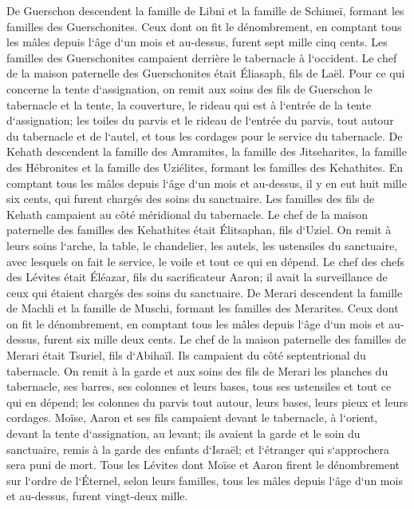\verse De Guerschon descendent la famille de Libni et la famille de Schimeï, formant les familles des Guerschonites. 
\verse Ceux dont on fit le dénombrement, en comptant tous les mâles depuis l`âge d`un mois et au-dessus, furent sept mille cinq cents. 
\verse Les familles des Guerschonites campaient derrière le tabernacle à l`occident. 
\verse Le chef de la maison paternelle des Guerschonites était Éliasaph, fils de Laël. 
\verse Pour ce qui concerne la tente d`assignation, on remit aux soins des fils de Guerschon le tabernacle et la tente, la couverture, le rideau qui est à l`entrée de la tente d`assignation; 
\verse les toiles du parvis et le rideau de l`entrée du parvis, tout autour du tabernacle et de l`autel, et tous les cordages pour le service du tabernacle. 
\verse De Kehath descendent la famille des Amramites, la famille des Jitseharites, la famille des Hébronites et la famille des Uziélites, formant les familles des Kehathites. 
\verse En comptant tous les mâles depuis l`âge d`un mois et au-dessus, il y en eut huit mille six cents, qui furent chargés des soins du sanctuaire. 
\verse Les familles des fils de Kehath campaient au côté méridional du tabernacle. 
\verse Le chef de la maison paternelle des familles des Kehathites était Élitsaphan, fils d`Uziel. 
\verse On remit à leurs soins l`arche, la table, le chandelier, les autels, les ustensiles du sanctuaire, avec lesquels on fait le service, le voile et tout ce qui en dépend. 
\verse Le chef des chefs des Lévites était Éléazar, fils du sacrificateur Aaron; il avait la surveillance de ceux qui étaient chargés des soins du sanctuaire. 
\verse De Merari descendent la famille de Machli et la famille de Muschi, formant les familles des Merarites. 
\verse Ceux dont on fit le dénombrement, en comptant tous les mâles depuis l`âge d`un mois et au-dessus, furent six mille deux cents. 
\verse Le chef de la maison paternelle des familles de Merari était Tsuriel, fils d`Abihaïl. Ils campaient du côté septentrional du tabernacle. 
\verse On remit à la garde et aux soins des fils de Merari les planches du tabernacle, ses barres, ses colonnes et leurs bases, tous ses ustensiles et tout ce qui en dépend; 
\verse les colonnes du parvis tout autour, leurs bases, leurs pieux et leurs cordages. 
\verse Moïse, Aaron et ses fils campaient devant le tabernacle, à l`orient, devant la tente d`assignation, au levant; ils avaient la garde et le soin du sanctuaire, remis à la garde des enfants d`Israël; et l`étranger qui s`approchera sera puni de mort. 
\verse Tous les Lévites dont Moïse et Aaron firent le dénombrement sur l`ordre de l`Éternel, selon leurs familles, tous les mâles depuis l`âge d`un mois et au-dessus, furent vingt-deux mille. 
